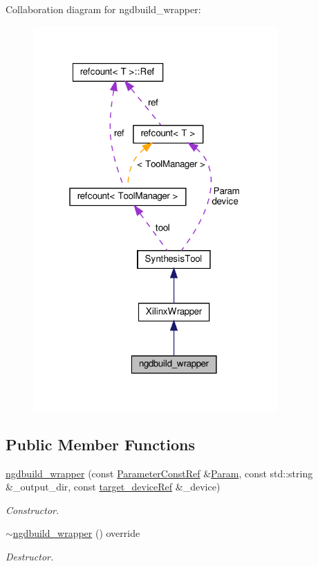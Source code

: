 Collaboration diagram for ngdbuild\+\_\+wrapper\+:
\nopagebreak
\begin{figure}[H]
\begin{center}
\leavevmode
\includegraphics[width=265pt]{db/daf/classngdbuild__wrapper__coll__graph}
\end{center}
\end{figure}
\subsection*{Public Member Functions}
\begin{DoxyCompactItemize}
\item 
\hyperlink{classngdbuild__wrapper_a24d1db56f6ac9df37c9fba5edbaa170b}{ngdbuild\+\_\+wrapper} (const \hyperlink{Parameter_8hpp_a37841774a6fcb479b597fdf8955eb4ea}{Parameter\+Const\+Ref} \&\hyperlink{classSynthesisTool_a854ef102782ff4d069e1aa6d1a94d64e}{Param}, const std\+::string \&\+\_\+output\+\_\+dir, const \hyperlink{target__device_8hpp_acedb2b7a617e27e6354a8049fee44eda}{target\+\_\+device\+Ref} \&\+\_\+device)
\begin{DoxyCompactList}\small\item\em Constructor. \end{DoxyCompactList}\item 
\hyperlink{classngdbuild__wrapper_a2ada66a145fed585a78fd7f87363f50f}{$\sim$ngdbuild\+\_\+wrapper} () override
\begin{DoxyCompactList}\small\item\em Destructor. \end{DoxyCompactList}\end{DoxyCompactItemize}
